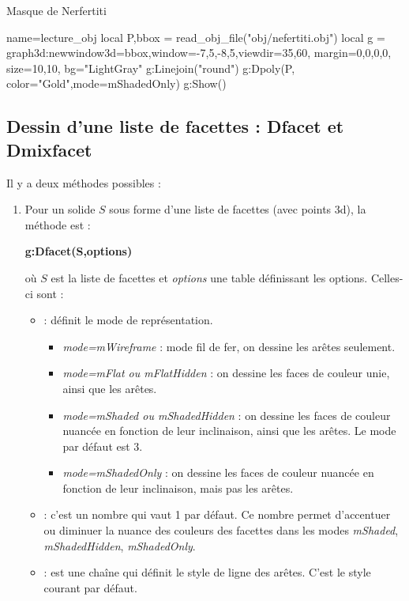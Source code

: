 \begin{demo}{Masque de Nerfertiti}
\begin{luadraw}{name=lecture_obj}
local P,bbox = read_obj_file("obj/nefertiti.obj")
local g = graph3d:new{window3d=bbox,window={-7,5,-8,5},viewdir={35,60},
    margin={0,0,0,0}, size={10,10}, bg="LightGray"}
g:Linejoin("round")
g:Dpoly(P, {color="Gold",mode=mShadedOnly})
g:Show() 
\end{luadraw}
\end{demo}


\subsection{Dessin d'une liste de facettes : Dfacet et Dmixfacet}

Il y a deux méthodes possibles :
\begin{enumerate}
    \item Pour un solide $S$ sous forme d'une liste de facettes (avec points 3d), la méthode est :
    \par\hfil\textbf{g:Dfacet(S,options)}\hfil\par
    où $S$ est la liste de facettes et \emph{options} une table définissant les options. Celles-ci sont :
\begin{itemize}
    \item {} : définit le mode de représentation.
        \begin{itemize}
            \item \emph{mode=mWireframe} : mode fil de fer, on dessine les arêtes seulement.
            \item \emph{mode=mFlat ou mFlatHidden} : on dessine les faces de couleur unie, ainsi que les arêtes.
            \item \emph{mode=mShaded ou mShadedHidden} : on dessine les faces de couleur nuancée en fonction de leur inclinaison, ainsi que les arêtes. Le mode par défaut est 3.
            \item \emph{mode=mShadedOnly} :  on dessine les faces de couleur nuancée en fonction de leur inclinaison, mais pas les arêtes.
        \end{itemize}
        \item {} : c'est un nombre qui vaut 1 par défaut. Ce nombre permet d'accentuer ou diminuer la nuance des couleurs des facettes dans les modes \emph{mShaded}, \emph{mShadedHidden}, \emph{mShadedOnly}.
        \item {} : est une chaîne qui définit le style de ligne des arêtes. C'est le style courant par défaut.

\end{itemize}
\end{enumerate}
